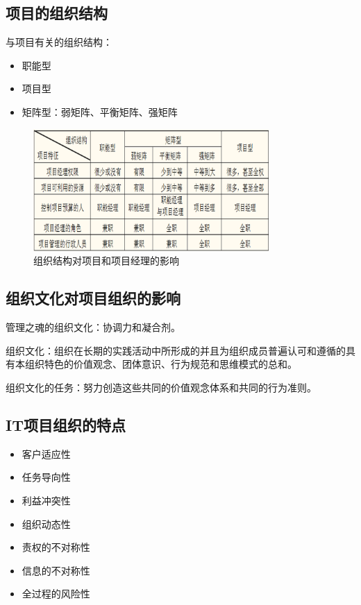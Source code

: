 \subsection{项目的组织结构}
与项目有关的组织结构：
\begin{itemize}
	\item 职能型
	\item 项目型
	\item 矩阵型：弱矩阵、平衡矩阵、强矩阵
\end{itemize}
\begin{figure}[!h]
	\centering
	\includegraphics[width=0.8\textwidth]{image/2-3}
	\caption{组织结构对项目和项目经理的影响}
\end{figure}
\subsection{组织文化对项目组织的影响}
管理之魂的组织文化：协调力和凝合剂。
\par 组织文化：组织在长期的实践活动中所形成的并且为组织成员普遍认可和遵循的具有本组织特色的价值观念、团体意识、行为规范和思维模式的总和。
\par 组织文化的任务：努力创造这些共同的价值观念体系和共同的行为准则。
\subsection{IT项目组织的特点}
\begin{itemize}
	\item 客户适应性
	\item 任务导向性
	\item 利益冲突性
	\item 组织动态性
	\item 责权的不对称性
	\item 信息的不对称性
	\item 全过程的风险性
\end{itemize}

